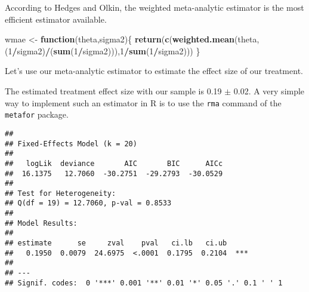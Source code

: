 \documentclass[]{book}
\newenvironment{Shaded}{\begin{snugshade}}{\end{snugshade}}
\newcommand{\KeywordTok}[1]{\textcolor[rgb]{0.13,0.29,0.53}{\textbf{#1}}}
\newcommand{\DataTypeTok}[1]{\textcolor[rgb]{0.13,0.29,0.53}{#1}}
\newcommand{\DecValTok}[1]{\textcolor[rgb]{0.00,0.00,0.81}{#1}}
\newcommand{\StringTok}[1]{\textcolor[rgb]{0.31,0.60,0.02}{#1}}
\newcommand{\ControlFlowTok}[1]{\textcolor[rgb]{0.13,0.29,0.53}{\textbf{#1}}}
\newcommand{\OperatorTok}[1]{\textcolor[rgb]{0.81,0.36,0.00}{\textbf{#1}}}
\newcommand{\NormalTok}[1]{#1}
\theoremstyle{definition}
\theoremstyle{definition}
\theoremstyle{definition}
\theoremstyle{remark}
\let\BeginKnitrBlock\begin \let\EndKnitrBlock\end
\begin{document}
\BeginKnitrBlock{remark}
\iffalse{} {Remark. } \fi{}According to Hedges and Olkin, the weighted
meta-analytic estimator is the most efficient estimator available.
\EndKnitrBlock{remark}

\begin{Shaded}
\begin{Highlighting}[]
\NormalTok{wmae <-}\StringTok{ }\ControlFlowTok{function}\NormalTok{(theta,sigma2)\{}
  \KeywordTok{return}\NormalTok{(}\KeywordTok{c}\NormalTok{(}\KeywordTok{weighted.mean}\NormalTok{(theta,(}\DecValTok{1}\OperatorTok{/}\NormalTok{sigma2)}\OperatorTok{/}\NormalTok{(}\KeywordTok{sum}\NormalTok{(}\DecValTok{1}\OperatorTok{/}\NormalTok{sigma2))),}\DecValTok{1}\OperatorTok{/}\KeywordTok{sum}\NormalTok{(}\DecValTok{1}\OperatorTok{/}\NormalTok{sigma2)))}
\NormalTok{\}}
\end{Highlighting}
\end{Shaded}

\BeginKnitrBlock{example}
\protect\hypertarget{exm:unnamed-chunk-141}{}{\label{exm:unnamed-chunk-141}
}Let's use our meta-analytic estimator to estimate the effect size of
our treatment.
\EndKnitrBlock{example} The estimated treatment effect size with our
sample is 0.19 \(\pm\) 0.02. A very simple way to implement such an
estimator in R is to use the \texttt{rma} command of the
\texttt{metafor} package.

\begin{Shaded}
\end{Shaded}

\begin{verbatim}
## 
## Fixed-Effects Model (k = 20)
## 
##   logLik  deviance       AIC       BIC      AICc  
##  16.1375   12.7060  -30.2751  -29.2793  -30.0529  
## 
## Test for Heterogeneity: 
## Q(df = 19) = 12.7060, p-val = 0.8533
## 
## Model Results:
## 
## estimate      se     zval    pval   ci.lb   ci.ub     
##   0.1950  0.0079  24.6975  <.0001  0.1795  0.2104  ***
## 
## ---
## Signif. codes:  0 '***' 0.001 '**' 0.01 '*' 0.05 '.' 0.1 ' ' 1
\end{verbatim}
\end{document}
